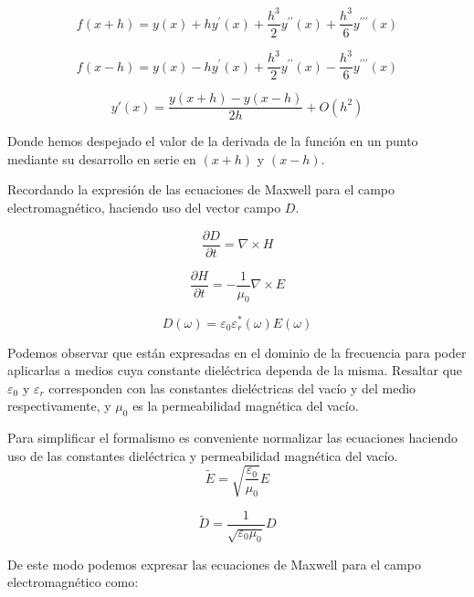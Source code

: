 \documentclass[11pt,a4paper,twoside,pdf]{article}
\numberwithin{equation}{section}
\begin{document}
\begin{equation}
f(x+h)=y(x)+hy^\prime(x)+\frac{h^3}{2}y^{\prime\prime}(x)+\frac{h^3}{6}y^{\prime\prime\prime}(x)
\end{equation}

\begin{equation}
f(x-h)=y(x)-hy^\prime(x)+\frac{h^3}{2}y^{\prime\prime}(x)-\frac{h^3}{6}y^{\prime\prime\prime}(x)
\end{equation}

\begin{equation}
y\prime(x)=\frac{y(x+h)-y(x-h)}{2h}+O(h^2)
\end{equation}

Donde hemos despejado el valor de la derivada de la función en un punto mediante su desarrollo en serie en $(x+h)$ y $(x-h)$.

Recordando la expresión de las ecuaciones de Maxwell para el campo electromagnético, haciendo uso del vector campo $D$.

\begin{equation}
\frac{\partial D}{\partial t}=\nabla \times H
\end{equation}

\begin{equation}
\frac{\partial H}{\partial t}=-\frac{1}{\mu_{0}}\nabla \times E
\end{equation}

\begin{equation}
D(\omega)=\varepsilon_{0}\varepsilon^*_{r}(\omega)E(\omega)
\end{equation}

Podemos observar que están expresadas en el dominio de la frecuencia para poder aplicarlas a medios cuya constante dieléctrica dependa de la misma. Resaltar que $\varepsilon_{0}$ y $\varepsilon_{r}$ corresponden con las constantes dieléctricas del vacío y del medio respectivamente, y $\mu_{0}$ es la permeabilidad magnética del vacío.


Para simplificar el formalismo es conveniente normalizar las ecuaciones haciendo uso de las constantes dieléctrica y permeabilidad magnética del vacío.
\begin{equation}
\tilde{E}=\sqrt{\frac{\varepsilon_{0}}{\mu_{0}}}E
\end{equation}

\begin{equation}
\tilde{D}=\frac{1}{\sqrt{\varepsilon_{0}\mu_{0}}}D
\end{equation}

De este modo podemos expresar las ecuaciones de Maxwell para el campo electromagnético como:
\end{document}
